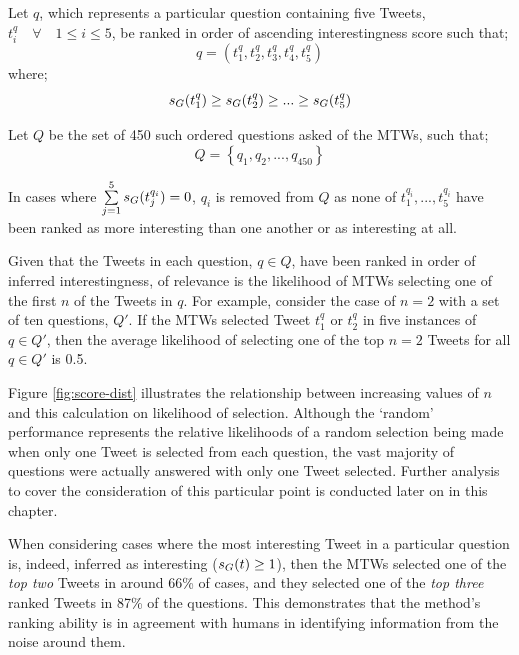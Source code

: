 Let $q$, which represents a particular question containing five Tweets, $t^q_i \quad \forall \quad 1 \leq i \leq 5$, be ranked in order of ascending interestingness score such that;
\[
    q = (t^q_1, t^q_2, t^q_3, t^q_4, t^q_5)
\]
where; 
\[
    s_G(t^q_1) \geq s_G(t^q_2) \geq ... \geq s_G(t^q_5)
\]

Let $Q$ be the set of 450 such ordered questions asked of the MTWs, such that;
\[
    Q = \left\{q_1, q_2, ..., q_{450}\right\}
\]

In cases where $\sum\limits_{j=1}^5 s_G(t^{q_i}_j) = 0$, $q_i$ is removed from $Q$ as none of $t^{q_i}_1,..., t^{q_i}_5$ have been ranked as more interesting than one another or as interesting at all. 

Given that the Tweets in each question, $q \in Q$, have been ranked in order of inferred interestingness, of relevance is the likelihood of MTWs selecting one of the first $n$ of the Tweets in $q$. For example, consider the case of $n=2$ with a set of ten questions, $Q'$. If the MTWs selected Tweet $t^{q}_1$ or $t^{q}_2$ in five instances of $q \in Q'$, then the average likelihood of selecting one of the top $n=2$ Tweets for all $q \in Q'$ is 0.5.

Figure \ref{fig:score-dist} illustrates the relationship between increasing values of $n$ and this calculation on likelihood of selection. Although the `random' performance represents the relative likelihoods of a random selection being made when only one Tweet is selected from each question, the vast majority of questions were actually answered with only one Tweet selected. Further analysis to cover the consideration of this particular point is conducted later on in this chapter.


When considering cases where the most interesting Tweet in a particular question is, indeed, inferred as interesting ($s_G(t) \geq 1$), then the MTWs selected one of the \textit{top two} Tweets in around 66\% of cases, and they selected one of the \textit{top three} ranked Tweets in 87\% of the questions. This demonstrates that the method's ranking ability is in agreement with humans in identifying information from the noise around them.

